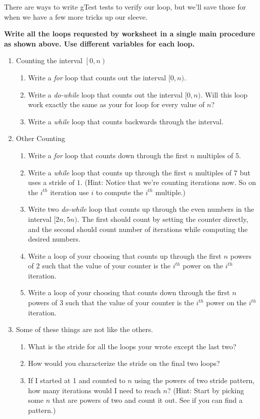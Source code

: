 \documentclass[nobib]{tufte-handout}
\begin{document}
There are ways to write gTest tests to verify our loop, but we'll save those for when we have a few more tricks up our sleeve.

\begin{center}
  \textbf{Write all the loops requested by worksheet in a single main procedure as shown above. Use different variables for each loop.}
\end{center}

\begin{enumerate}
  \item Counting the interval $\left[{0,n}\right)$
  \begin{enumerate}
    \item Write a \textit{for} loop that counts out the interval $[0,n)$.
    \item Write a \textit{do-while} loop that counts out the interval $[0,n)$.  Will this loop work exactly the same as your for loop for every value of $n$?
    \item Write a \textit{while} loop that counts backwards through the interval.
  \end{enumerate}
\item Other Counting
\begin{enumerate}
  \item Write a \textit{for} loop that counts down through the first $n$ multiples of $5$.
  \item Write a \textit{while} loop that counts up through the first $n$ multiples of $7$ but uses a stride of $1$. (Hint: Notice that we're counting iterations now. So on the $i^{th}$ iteration use $i$ to compute the $i^{th}$ multiple.)
  \item Write two \textit{do-while} loop that counts up through the even numbers in the interval $[2n,5n)$. The first should count by setting the counter directly, and the second should count number of iterations while computing the desired numbers.
  \item Write a loop of your choosing that counts up through the first $n$ powers of $2$ such that the value of your counter is the $i^{th}$ power on the $i^{th}$ iteration.
  \item Write a loop of your choosing that counts down through the first $n$ powers of $3$ such that the value of your counter is the $i^{th}$ power on the $i^{th}$ iteration.
\end{enumerate}
\item Some of these things are not like the others.
\begin{enumerate}
  \item What is the stride for all the loops your wrote except the last two?
  \vspace{2in}
  \item How would you characterize the stride on the final two loops?
  \vspace{2in}
  \item If I started at 1 and counted to $n$ using the powers of two stride pattern, how many iterations would I need to reach $n$?  (Hint: Start by picking some $n$ that are powers of two and count it out. See if you can find a pattern.)
\end{enumerate}
\end{enumerate}
\end{document}
